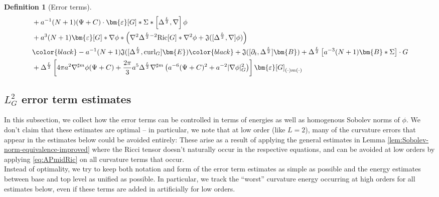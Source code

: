 \documentclass[11pt,leqno,textwidth=10cm]{amsart}
\numberwithin{equation}{section}
\theoremstyle{definition}
\newtheorem{definition}{Definition}[section]
\theoremstyle{plain}
\newcommand{\1}{\mathbbm{1}}
\newcommand{\Ric}{\text{\normalfont{Ric}}}
\renewcommand{\epsilon}{\varepsilon}
\newcommand{\del}{\partial}
\newcommand{\Lap}{\Delta}
\newcommand{\curl}{\text{\normalfont{curl}}}
\newcommand{\RE}{\bm{E}}
\newcommand{\RB}{\bm{B}}
\newcommand{\epsilonLC}{\bm{\epsilon}}
\newcommand{\change}[1]{\color{black}#1\color{black}}
\begin{document}
\begin{definition}[Error terms]
{\begin{subequations}
\begin{align*}
&\,+a^{-1}(N+1)(\Psi+C)\cdot\epsilonLC[G]\ast\Sigma\ast\left[\Lap^\frac{L}2,\nabla\right]\phi\\
&\,+a^3(N+1)\epsilonLC[G]\ast\nabla\phi\ast\left(\nabla^2\Lap^{\frac{L}2-2}\Ric[G]\ast\nabla^2\phi+\mathfrak{J}([\Lap^{\frac{L}2},\nabla]\phi)\right)\\
&\,\change{-a^{-1}(N+1)\mathfrak{J}([\Lap^\frac{L}2,\curl_G]\RE)}+\mathfrak{J}([\del_t,\Lap^{\frac{L}2}]\RB)+\Lap^\frac{L}2\left[a^{-3}(N+1)\RB\ast\Sigma\right]\cdot G\\
&\,+\Lap^{\frac{L}2}\left[4\pi a^2\nabla^{\sharp m}\phi(\Psi+C)+\frac{2\pi}3a^5\Lap^{\frac{L}2}\nabla^{\sharp m}\left(a^{-6}(\Psi+C)^2+a^{-2}\lvert\nabla\phi\rvert_G^2\right)\right]\epsilonLC[G]_{(\cdot)m(\cdot)}
\end{align*}
\end{subequations}}
\end{definition}

\subsection{$L^2_G$ error term estimates}\label{subsec:L2-error-est}

In this subsection, we collect how the error terms can be controlled in terms of energies as well as homogenous Sobolev norms of $\phi$. We don't claim that these estimates are optimal -- in particular, we note that at low order (like $L=2$), many of the curvature errors that appear in the estimates below could be avoided entirely: These arise as a result of applying the general estimates in Lemma \ref{lem:Sobolev-norm-equivalence-improved} where the Ricci tensor doesn't naturally occur in the respective equations, and can be avoided at low orders by applying \eqref{eq:APmidRic} on all curvature terms that occur. \\
Instead of optimality, we try to keep both notation and form of the error term estimates as simple as possible and the energy estimates between base and top level as unified as possible. In particular, we track the \enquote{worst} curvature energy occurring at high orders for all estimates below, even if these terms are added in artificially for low orders.
\end{document}
